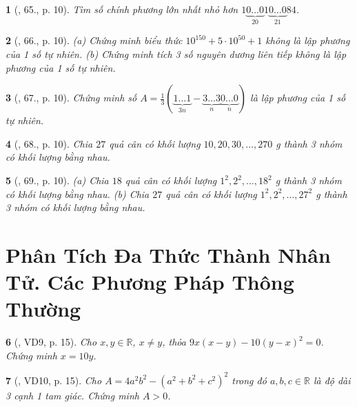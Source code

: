 \documentclass{article}
\newtheorem{baitoan}{}
\begin{document}
\begin{baitoan}[\cite{Binh_Toan_8_tap_1}, 65., p. 10]
	Tìm số chính phương lớn nhất nhỏ hơn $1\underbrace{0\ldots0}_{20}1\underbrace{0\ldots0}_{21}84$.
\end{baitoan}

\begin{baitoan}[\cite{Binh_Toan_8_tap_1}, 66., p. 10]
	(a) Chứng minh biểu thức $10^{150} + 5\cdot10^{50} + 1$ không là lập phương của 1 số tự nhiên. (b) Chứng minh tích 3 số nguyên dương liên tiếp không là lập phương của 1 số tự nhiên.
\end{baitoan}

\begin{baitoan}[\cite{Binh_Toan_8_tap_1}, 67., p. 10]
	Chứng minh số $A = \frac{1}{3}\left(\underbrace{1\ldots1}_{3n} - \underbrace{3\ldots3}_n\underbrace{0\ldots0}_n\right)$ là lập phương của 1 số tự nhiên.
\end{baitoan}

\begin{baitoan}[\cite{Binh_Toan_8_tap_1}, 68., p. 10]
	Chia $27$ quả cân có khối lượng $10,20,30,\ldots,270$ {\rm g} thành 3 nhóm có khối lượng bằng nhau.
\end{baitoan}

\begin{baitoan}[\cite{Binh_Toan_8_tap_1}, 69., p. 10]
	(a) Chia $18$ quả cân có khối lượng $1^2,2^2,\ldots,18^2$ {\rm g} thành 3 nhóm có khối lượng bằng nhau. (b) Chia $27$ quả cân có khối lượng $1^2,2^2,\ldots,27^2$ {\rm g} thành 3 nhóm có khối lượng bằng nhau.
\end{baitoan}


\section{Phân Tích Đa Thức Thành Nhân Tử. Các Phương Pháp Thông Thường}

\begin{baitoan}[\cite{Tuyen_Toan_8}, VD9, p. 15]
	Cho $x,y\in\mathbb{R}$, $x\ne y$, thỏa $9x(x - y) - 10(y - x)^2 = 0$. Chứng minh $x = 10y$.
\end{baitoan}

\begin{baitoan}[\cite{Tuyen_Toan_8}, VD10, p. 15]
	Cho $A = 4a^2b^2 - (a^2 + b^2 + c^2)^2$ trong đó $a,b,c\in\mathbb{R}$ là độ dài 3 cạnh 1 tam giác. Chứng minh $A > 0$.
\end{baitoan}
\end{document}
